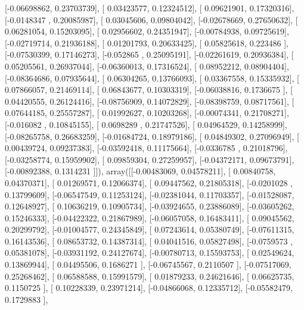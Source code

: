 \documentclass{article}
\begin{document}
       [-0.06698862,  0.23703739],
       [ 0.03423577,  0.12324512],
       [ 0.09621901,  0.17320316],
       [-0.0148347 ,  0.20085987],
       [ 0.03045606,  0.09804042],
       [-0.02678669,  0.27650632],
       [ 0.06281054,  0.15203095],
       [ 0.02956602,  0.24351947],
       [-0.00784938,  0.09725619],
       [-0.02719714,  0.21936188],
       [ 0.01201793,  0.20633425],
       [ 0.05825618,  0.223486  ],
       [-0.07530399,  0.17146273],
       [-0.052865  ,  0.25095191],
       [-0.02261619,  0.20936384],
       [ 0.05205561,  0.26937044],
       [-0.06360013,  0.17316524],
       [ 0.08952212,  0.08904404],
       [-0.08364686,  0.07935644],
       [ 0.06304265,  0.13766093],
       [ 0.03367558,  0.15335932],
       [ 0.07866057,  0.21469114],
       [ 0.06843677,  0.10303319],
       [-0.06038816,  0.1736675 ],
       [ 0.04420555,  0.26124416],
       [-0.08756909,  0.14072829],
       [-0.08398759,  0.08717561],
       [ 0.07644185,  0.25557287],
       [ 0.01992627,  0.10203268],
       [-0.00074341,  0.21708271],
       [-0.016082  ,  0.10845155],
       [ 0.0698289 ,  0.21747526],
       [ 0.04964529,  0.14258999],
       [-0.08265758,  0.26683259],
       [-0.01684724,  0.18979186],
       [ 0.04849302,  0.27096949],
       [ 0.00439724,  0.09237383],
       [-0.03592418,  0.11175664],
       [-0.0336785 ,  0.21018796],
       [-0.03258774,  0.15959902],
       [ 0.09859304,  0.27259957],
       [-0.04372171,  0.09673791],
       [-0.00892388,  0.1314231 ]]), array([[-0.00483069,  0.04578211],
       [ 0.00840758,  0.04370371],
       [ 0.01269571,  0.12066374],
       [ 0.09447562,  0.21805318],
       [-0.0201028 ,  0.13799609],
       [-0.06547549,  0.11253124],
       [-0.02381044,  0.11703357],
       [-0.01528087,  0.12648927],
       [ 0.10636219,  0.10905734],
       [-0.03924655,  0.23886089],
       [-0.03605262,  0.15246333],
       [-0.04422322,  0.21867989],
       [-0.06057058,  0.16483411],
       [ 0.09045562,  0.20299792],
       [-0.01004577,  0.24345849],
       [ 0.07243614,  0.05380749],
       [-0.07611315,  0.16143536],
       [ 0.08653732,  0.14387314],
       [ 0.04041516,  0.05827498],
       [-0.0759573 ,  0.05381078],
       [-0.03931192,  0.24127674],
       [-0.00780713,  0.15593753],
       [ 0.02549624,  0.13869944],
       [ 0.04495506,  0.1686271 ],
       [-0.06745567,  0.2110507 ],
       [-0.07517069,  0.25268462],
       [ 0.06588588,  0.15991579],
       [ 0.01879233,  0.24621646],
       [ 0.06625735,  0.1150725 ],
       [ 0.10228339,  0.23971214],
       [-0.04866068,  0.12335712],
       [-0.05582479,  0.1729883 ],
\end{document}
